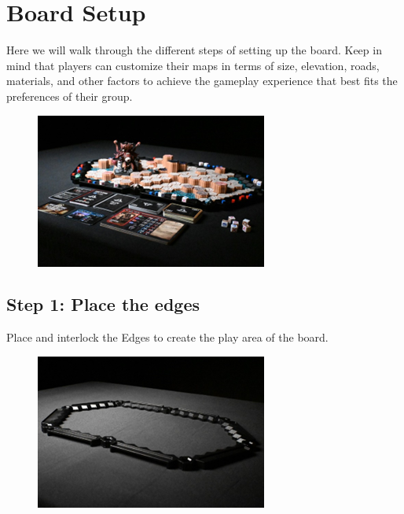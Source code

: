 \documentclass[../main.tex]{subfiles}
\begin{document}
\section{Board Setup}
Here we will walk through the different steps of setting up the board. Keep in mind that players can customize their maps in terms of size, elevation, roads, materials, and other factors to achieve the gameplay experience that best fits the preferences of their group.
\begin{figure}[h]
    \centering
    \includegraphics[width=1\linewidth]{boardsetup1.png}
\end{figure}

\subsection{Step 1:  Place the edges}
Place and interlock the Edges to create the play area of the board.

\begin{figure}[h]
    \tsgap
    \centering
    \includegraphics[width=1\linewidth]{boardsetup_edges.png}
\end{figure}
\end{document}
